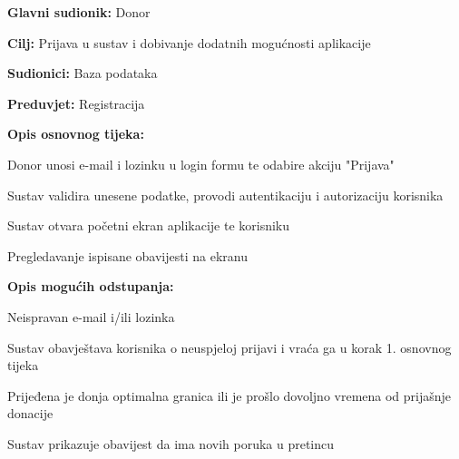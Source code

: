 \eject 
\noindent {}
					\begin{packed_item}
	
						\item \textbf{Glavni sudionik: }Donor
						\item \textbf{Cilj:} Prijava u sustav i dobivanje dodatnih mogućnosti aplikacije
						\item \textbf{Sudionici:} Baza podataka
						\item \textbf{Preduvjet:} Registracija
						\item \textbf{Opis osnovnog tijeka:}
						
						\item[] \begin{packed_enum}
	
							\item Donor unosi e-mail i lozinku u login formu te odabire akciju "Prijava"
							\item Sustav validira unesene podatke, provodi autentikaciju i autorizaciju korisnika
							\item Sustav otvara početni ekran aplikacije te korisniku 
							\item Pregledavanje ispisane obavijesti na ekranu 
							
						\end{packed_enum}
						\item  \textbf{Opis mogućih odstupanja:}
						
						\item[] \begin{packed_item}
	
							\item[2.a] Neispravan e-mail i/ili lozinka
							\item[] \begin{packed_enum}
								
								\item  Sustav obavještava korisnika o neuspjeloj prijavi i vraća ga u korak 1. osnovnog tijeka
								\end{packed_enum}
							\item[3.a] Prijeđena je donja optimalna granica ili je prošlo dovoljno vremena od prijašnje donacije
							\item[] \begin{packed_enum}
								
								\item  Sustav prikazuje obavijest da ima novih poruka u pretincu
							\end{packed_enum}
					\end{packed_item}
					\end{packed_item}
